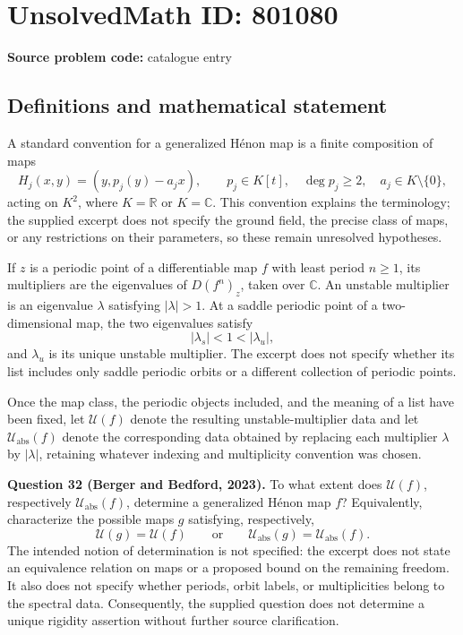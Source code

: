\documentclass[11pt]{article}
\newcommand{\R}{\mathbb{R}}
\newcommand{\C}{\mathbb{C}}
\begin{document}
\section*{UnsolvedMath ID: 801080}
\textbf{Source problem code:} catalogue entry
\subsection{Definitions and mathematical statement}
A standard convention for a generalized H\'enon map is a finite composition of maps
\[
H_j(x,y)=(y,p_j(y)-a_jx),\qquad p_j\in K[t],\quad \deg p_j\geq 2,\quad a_j\in K\setminus\{0\},
\]
acting on \(K^2\), where \(K=\R\) or \(K=\C\). This convention explains the terminology; the supplied excerpt does not specify the ground field, the precise class of maps, or any restrictions on their parameters, so these remain unresolved hypotheses.

If \(z\) is a periodic point of a differentiable map \(f\) with least period \(n\geq1\), its multipliers are the eigenvalues of \(D(f^n)_z\), taken over \(\C\). An unstable multiplier is an eigenvalue \(\lambda\) satisfying \(|\lambda|>1\). At a saddle periodic point of a two-dimensional map, the two eigenvalues satisfy
\[
|\lambda_s|<1<|\lambda_u|,
\]
and \(\lambda_u\) is its unique unstable multiplier. The excerpt does not specify whether its list includes only saddle periodic orbits or a different collection of periodic points.

Once the map class, the periodic objects included, and the meaning of a list have been fixed, let \(\mathcal U(f)\) denote the resulting unstable-multiplier data and let \(\mathcal U_{\mathrm{abs}}(f)\) denote the corresponding data obtained by replacing each multiplier \(\lambda\) by \(|\lambda|\), retaining whatever indexing and multiplicity convention was chosen.

\textbf{Question 32 (Berger and Bedford, 2023).} To what extent does \(\mathcal U(f)\), respectively \(\mathcal U_{\mathrm{abs}}(f)\), determine a generalized H\'enon map \(f\)? Equivalently, characterize the possible maps \(g\) satisfying, respectively,
\[
\mathcal U(g)=\mathcal U(f)
\qquad\text{or}\qquad
\mathcal U_{\mathrm{abs}}(g)=\mathcal U_{\mathrm{abs}}(f).
\]
The intended notion of determination is not specified: the excerpt does not state an equivalence relation on maps or a proposed bound on the remaining freedom. It also does not specify whether periods, orbit labels, or multiplicities belong to the spectral data. Consequently, the supplied question does not determine a unique rigidity assertion without further source clarification.
\end{document}
